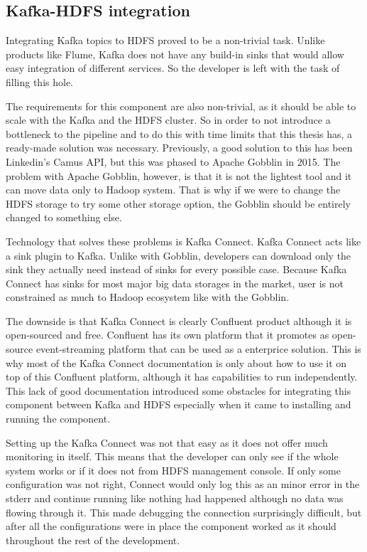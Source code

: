 \subsection{Kafka-HDFS integration}

Integrating Kafka topics to HDFS proved to be a non-trivial task.
Unlike products like Flume, Kafka does not have any build-in sinks that would allow easy integration of different services.
So the developer is left with the task of filling this hole.

The requirements for this component are also non-trivial, as it should be able to scale with the Kafka and the HDFS cluster.
So in order to not introduce a bottleneck to the pipeline and to do this with time limits that this thesis has, a ready-made solution was necessary.
Previously, a good solution to this has been Linkedin's Camus API, but this was phased to Apache Gobblin in 2015. 
The problem with Apache Gobblin, however, is that it is not the lightest tool and it can move data only to Hadoop system.
That is why if we were to change the HDFS storage to try some other storage option, the Gobblin should be entirely changed to something else.

Technology that solves these problems is Kafka Connect. 
Kafka Connect acts like a sink plugin to Kafka.
Unlike with Gobblin, developers can download only the sink they actually need instead of sinks for every possible case.
Because Kafka Connect has sinks for most major big data storages in the market, user is not constrained as much to Hadoop ecosystem like with the Gobblin.

The downside is that Kafka Connect is clearly Confluent product although it is open-sourced and free.
Confluent has its own platform that it promotes as open-source event-streaming platform that can be used as a enterprice solution. 
This is why most of the Kafka Connect documentation is only about how to use it on top of this Confluent platform, although it has capabilities to run independently.
This lack of good documentation introduced some obstacles for integrating this component between Kafka and HDFS especially when it came to installing and running the component.

Setting up the Kafka Connect was not that easy as it does not offer much monitoring in itself.
This means that the developer can only see if the whole system works or if it does not from HDFS management console.
If only some configuration was not right, Connect would only log this as an minor error in the stderr and continue running like nothing had happened although no data was flowing through it.
This made debugging the connection surprisingly difficult, but after all the configurations were in place the component worked as it should throughout the rest of the development.

